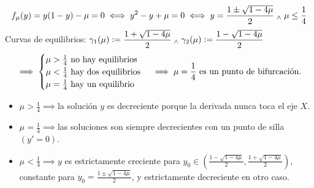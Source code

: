 \begin{ejem}[$\{y'=y(1-y)-\mu \we y(x_0) = y_0\}$]
	\[f_\mu(y)=y(1-y)-\mu=0 \iff y^2-y+\mu=0 \iff y=\frac{1\pm \sqrt{1-4\mu}}{2} \; _{\wedge} \; \mu \leq \frac{1}{4}\]
	Curvas de equilibrios: $\displaystyle \gamma_1(\mu)\vcentcolon=\frac{1+\sqrt{1-4\mu}}{2} \; _{\wedge} \; \gamma_2(\mu)\vcentcolon=\frac{1-\sqrt{1-4\mu}}{2}$
	\[\implies \begin{cases}
			\mu > \frac{1}{4} \text{ no hay equilibrios}  \\
			\mu < \frac{1}{4} \text{ hay dos equilibrios} \\
			\mu = \frac{1}{4} \text{ hay un equilibrio}   \\
		\end{cases} \implies \mu =\frac{1}{4} \text{ es un punto de bifurcación.}\]
	\begin{itemize}
		\item $\mu > \frac{1}{4} \implies $la solución $y$ es decreciente porque la derivada nunca toca el eje $X$.
		\item $\mu = \frac{1}{4} \implies $las soluciones son siempre decrecientes con un punto de silla $(y'=0)$.
		\item $\mu < \frac{1}{4} \implies y$ es estrictamente creciente para $y_0 \in \left(\frac{1-\sqrt{1-4\mu}}{2}, \frac{1+\sqrt{1-4\mu}}{2}\right)$, constante para $y_0 = \frac{1\pm\sqrt{1-4\mu}}{2}$, y estrictamente decreciente en otro caso.
	\end{itemize}
\end{ejem}
